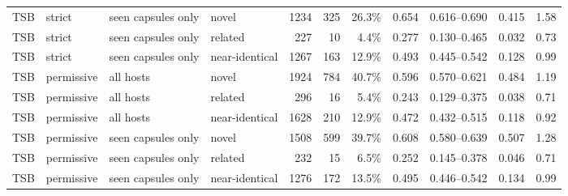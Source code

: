 \begin{table}[h]
\begin{tabular}{llllrrrrrrr}
TSB & strict & seen capsules only & novel & 1234 & 325 & 26.3\% & 0.654 & 0.616--0.690 & 0.415 & 1.58 \\
TSB & strict & seen capsules only & related & 227 & 10 & 4.4\% & 0.277 & 0.130--0.465 & 0.032 & 0.73 \\
TSB & strict & seen capsules only & near-identical & 1267 & 163 & 12.9\% & 0.493 & 0.445--0.542 & 0.128 & 0.99 \\
TSB & permissive & all hosts & novel & 1924 & 784 & 40.7\% & 0.596 & 0.570--0.621 & 0.484 & 1.19 \\
TSB & permissive & all hosts & related & 296 & 16 & 5.4\% & 0.243 & 0.129--0.375 & 0.038 & 0.71 \\
TSB & permissive & all hosts & near-identical & 1628 & 210 & 12.9\% & 0.472 & 0.432--0.515 & 0.118 & 0.92 \\
TSB & permissive & seen capsules only & novel & 1508 & 599 & 39.7\% & 0.608 & 0.580--0.639 & 0.507 & 1.28 \\
TSB & permissive & seen capsules only & related & 232 & 15 & 6.5\% & 0.252 & 0.145--0.378 & 0.046 & 0.71 \\
TSB & permissive & seen capsules only & near-identical & 1276 & 172 & 13.5\% & 0.495 & 0.446--0.542 & 0.134 & 0.99 \\
\hline
\end{tabular}
\label{tab:s4_sensitivity}
\end{table}
